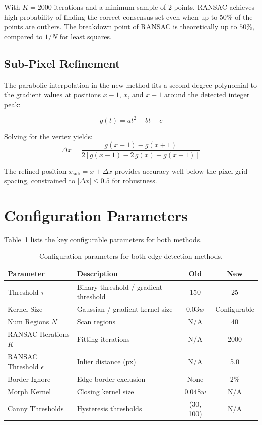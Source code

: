 \documentclass[12pt, a4paper]{article}
\begin{document}
With $K = 2000$ iterations and a minimum sample of 2 points, RANSAC achieves high probability of finding the correct consensus set even when up to 50\% of the points are outliers. The breakdown point of RANSAC is theoretically up to $50\%$, compared to $1/N$ for least squares.

\subsection{Sub-Pixel Refinement}

The parabolic interpolation in the new method fits a second-degree polynomial to the gradient values at positions $x-1$, $x$, and $x+1$ around the detected integer peak:

\begin{equation}
    g(t) = at^2 + bt + c
\end{equation}

Solving for the vertex yields:
\begin{equation}
    \Delta x = \frac{g(x-1) - g(x+1)}{2\left[g(x-1) - 2\,g(x) + g(x+1)\right]}
\end{equation}

The refined position $x_{\text{sub}} = x + \Delta x$ provides accuracy well below the pixel grid spacing, constrained to $|\Delta x| \leq 0.5$ for robustness.

\section{Configuration Parameters}

Table~\ref{tab:params} lists the key configurable parameters for both methods.

\begin{table}[H]
\centering
\caption{Configuration parameters for both edge detection methods.}
\label{tab:params}
\renewcommand{\arraystretch}{1.3}
\begin{tabular}{@{}llcc@{}}
\toprule
\textbf{Parameter} & \textbf{Description} & \textbf{Old} & \textbf{New} \\
\midrule
Threshold $\tau$ & Binary threshold / gradient threshold & 150 & 25 \\
Kernel Size & Gaussian / gradient kernel size & $0.03w$ & Configurable \\
Num Regions $N$ & Scan regions & N/A & 40 \\
RANSAC Iterations $K$ & Fitting iterations & N/A & 2000 \\
RANSAC Threshold $\epsilon$ & Inlier distance (px) & N/A & 5.0 \\
Border Ignore & Edge border exclusion & None & 2\% \\
Morph Kernel & Closing kernel size & $0.048w$ & N/A \\
Canny Thresholds & Hysteresis thresholds & (30, 100) & N/A \\
\bottomrule
\end{tabular}
\end{table}
\end{document}
